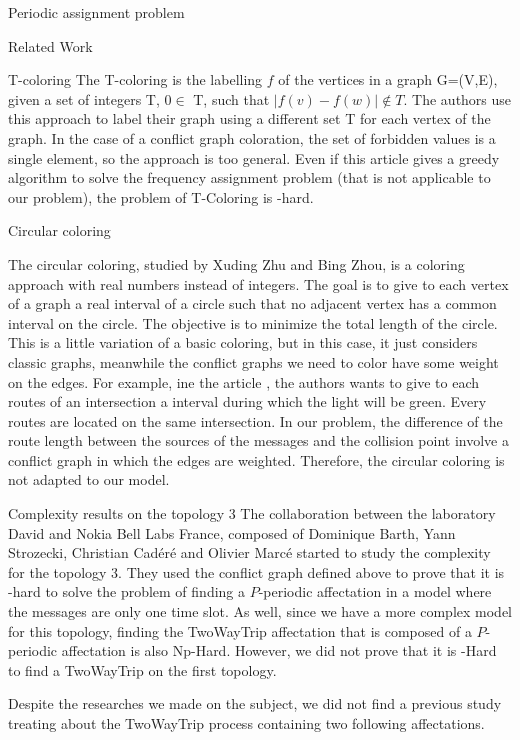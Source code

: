 \documentclass[a4paper,10pt]{report}
\begin{document}
\begin{chapter}{Periodic assignment problem}
\begin{section}{Related Work}
\begin{subsection}{T-coloring}
 The T-coloring is the labelling $f$ of the vertices in a graph G=(V,E), given a set of integers T, $0 \in$ T, such that 
 $|f(v) - f(w)| \notin T$.
 The authors use this approach to label their graph using a different set T for each vertex of the graph.
 In the case of a conflict graph coloration, the set of forbidden values is a single element, so the approach is too general.
 Even if this article gives a greedy algorithm to solve the frequency assignment problem (that is not applicable to our problem), the problem of T-Coloring is \NP-hard.

\end{subsection}
\begin{subsection}{Circular coloring}

 The circular coloring, studied by Xuding Zhu\cite{zhu2006recent}\cite{zhu2001circular} and Bing Zhou\cite{zhou2013multiple},
 is a coloring approach with real numbers instead of integers. The goal is to give to each vertex of a graph 
 a real interval of a circle such that no adjacent vertex has a common interval on the circle. The objective is to minimize the total length of the circle. This is a little variation of a
 basic coloring, but in this case, it just considers classic graphs, meanwhile the conflict graphs we need to color have some weight
 on the edges.
 For example, ine the article \cite{zhu2001circular}, the authors wants to give to each routes of an intersection a interval during which the light will be green. Every routes are located on the same intersection. In our problem, the difference of the route length between the sources of the messages and the collision point involve a conflict graph in which the edges are weighted.
 Therefore, the circular coloring is not adapted to our model.

\end{subsection}

\begin{subsection}{Complexity results on the topology 3}
 The collaboration between the laboratory David and Nokia Bell Labs France, composed of Dominique Barth, Yann Strozecki, Christian Cadéré and Olivier Marcé started to study the complexity for the topology 3.
 They used the conflict graph defined above to prove that it is \NP-hard to solve the problem of finding a $P$-periodic affectation in a model where the
 messages are only one time slot. As well, since we have a more complex model for this topology, finding the TwoWayTrip affectation
 that is composed of a $P$-periodic affectation is also Np-Hard. However, we did not prove that it is \NP-Hard to find
 a TwoWayTrip on the first topology.
\end{subsection}

 \end{section}

Despite the researches we made on the subject, we did not find a previous study treating about the TwoWayTrip process containing two 
following affectations.
\end{chapter}
\end{document}
